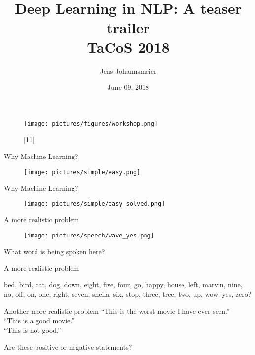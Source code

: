 \documentclass{beamer}
\title{Deep Learning in NLP: A teaser trailer\\ \small{TaCoS 2018}}
\author{Jens Johannsmeier}
\date{June 09, 2018}
\begin{document}
\begin{frame}
\titlepage
\end{frame}


\begin{frame}
\begin{figure}
\texttt{[image: pictures/figures/workshop.png]}
\caption*{[11]}
\end{figure}
\end{frame}


\begin{frame}{Why Machine Learning?}
\begin{figure}
\texttt{[image: pictures/simple/easy.png]}
\end{figure}
\end{frame}


\begin{frame}{Why Machine Learning?}
\begin{figure}
\texttt{[image: pictures/simple/easy\_solved.png]}
\end{figure}
\end{frame}


\begin{frame}{A more realistic problem}
\begin{figure}
\texttt{[image: pictures/speech/wave\_yes.png]}
\end{figure}
What word is being spoken here?
\end{frame}


\begin{frame}{A more realistic problem}
\begin{figure}
\end{figure}
bed, bird, cat, dog, down, eight, five, four, go, happy, house, left, marvin, nine, no, off, on, one, right, seven, sheila, six, stop, three, tree, two, up, wow, yes, zero?
\end{frame}


\begin{frame}{Another more realistic problem}
``This is the worst movie I have ever seen.'' \\
``This is a good movie.'' \\
``This is not good.'' \bigskip

Are these positive or negative statements?
\end{frame}
\end{document}
